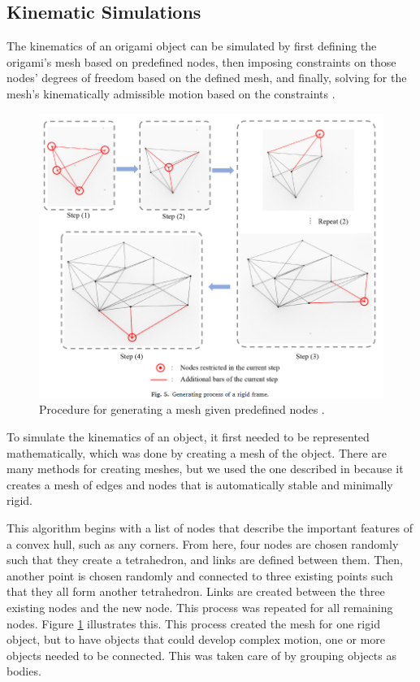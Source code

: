 \subsection{Kinematic Simulations}
The kinematics of an origami object can be simulated by first defining the origami's mesh based on predefined nodes, then imposing constraints on those nodes' degrees of freedom based on the defined mesh, and finally, solving for the mesh's kinematically admissible motion based on the constraints \cite{zhu2022review}. 
%
\begin{figure}[H]
    \centering
    \includegraphics[width=0.6\columnwidth]{Graphics/mesh_gen.png}
    \caption{Procedure for generating a mesh given predefined nodes \cite{zhang2021folding}.}
    \label{fig:mesh_gen}
\end{figure}
%
To simulate the kinematics of an object, it first needed to be represented mathematically, which was done by creating a mesh of the object. There are many methods for creating meshes, but we used the one described in \cite{zhang2021folding} because it creates a mesh of edges and nodes that is automatically stable and minimally rigid.

This algorithm begins with a list of nodes that describe the important features of a convex hull, such as any corners. From here, four nodes are chosen randomly such that they create a tetrahedron, and links are defined between them. Then, another point is chosen randomly and connected to three existing points such that they all form another tetrahedron. Links are created between the three existing nodes and the new node. This process was repeated for all remaining nodes. Figure \ref{fig:mesh_gen} illustrates this. This process created the mesh for one rigid object, but to have objects that could develop complex motion, one or more objects needed to be connected. This was taken care of by grouping objects as bodies.

